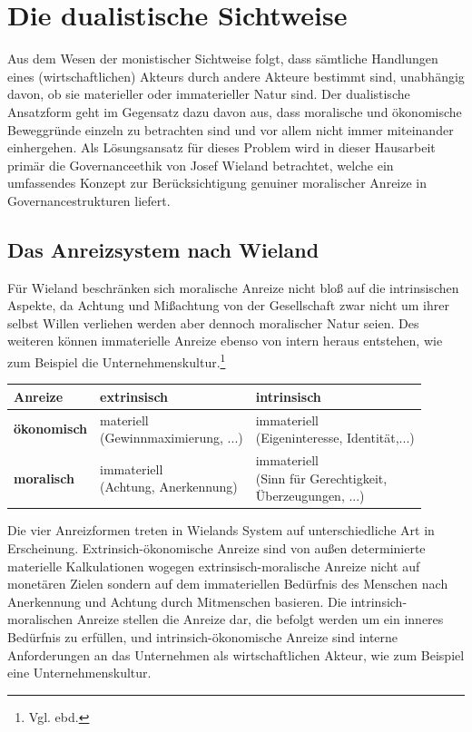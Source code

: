 \documentclass[12pt]{article}
\begin{document}
\section{Die dualistische Sichtweise}
Aus dem Wesen der monistischer Sichtweise folgt, dass sämtliche Handlungen eines (wirtschaftlichen) Akteurs durch andere Akteure bestimmt sind, unabhängig davon, ob sie materieller oder immaterieller Natur sind. Der dualistische Ansatzform geht im Gegensatz dazu davon aus, dass moralische und ökonomische Beweggründe einzeln zu betrachten sind und vor allem nicht immer miteinander einhergehen. Als Lösungsansatz für dieses Problem wird in dieser Hausarbeit primär die Governanceethik von Josef Wieland betrachtet, welche ein umfassendes Konzept zur Berücksichtigung genuiner moralischer Anreize in Governancestrukturen liefert.
\subsection{Das Anreizsystem nach Wieland}
Für Wieland beschränken sich moralische Anreize nicht bloß auf die intrinsischen Aspekte, da Achtung und Mißachtung von der Gesellschaft zwar nicht um ihrer selbst Willen verliehen werden aber dennoch moralischer Natur seien. Des weiteren können immaterielle Anreize ebenso von intern heraus entstehen, wie zum Beispiel die Unternehmenskultur.\footnote{Vgl. ebd.}
\begin{center}
\begin{tabular}{|p{3cm}|p{5cm}|p{5cm}|}
\hline
Anreize & \textbf{extrinsisch} & \textbf{intrinsisch}\\\hline
\textbf{ökonomisch} & \makecell[lt]{materiell\\(Gewinnmaximierung, ...)} & \makecell[lt]{immateriell\\ (Eigeninteresse, Identität,...)}\\\hline
\textbf{moralisch} & \makecell[lt]{immateriell\\(Achtung, Anerkennung)} & \makecell[lt]{immateriell\\(Sinn für Gerechtigkeit,\\Überzeugungen, ...)}\\\hline
\end{tabular}
\end{center}
Die vier Anreizformen treten in Wielands System auf unterschiedliche Art in Erscheinung. Extrinsich-ökonomische Anreize sind von außen determinierte materielle Kalkulationen wogegen extrinsisch-moralische Anreize nicht auf monetären Zielen sondern auf dem immateriellen Bedürfnis des Menschen nach Anerkennung und Achtung durch Mitmenschen basieren. Die intrinsich-moralischen Anreize stellen die Anreize dar, die befolgt werden um ein inneres Bedürfnis zu erfüllen, und intrinsich-ökonomische Anreize sind interne Anforderungen an das Unternehmen als wirtschaftlichen Akteur, wie zum Beispiel eine Unternehmenskultur.
\end{document}
